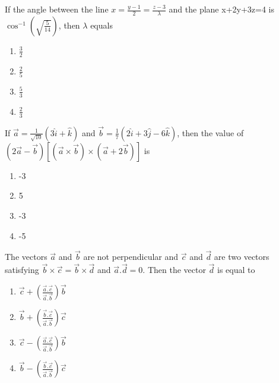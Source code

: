 \item If the angle between the line $x=\frac{y-1}{2}=\frac{z-3}{\lambda}$ and the plane x+2y+3z=4 is $\cos^{-1}(\sqrt{\frac{5}{14}})$, then $\lambda$ equals
\begin{enumerate}
\item $\frac{3}{2}$
\item $\frac{2}{5}$
\item $\frac{5}{3}$
\item $\frac{2}{3}$
\end{enumerate}

\item If $\overrightarrow{a}=\frac{1}{\sqrt{10}}(3\hat{i}+\hat{k})$ and $\overrightarrow{b}=\frac{1}{7}(2\hat{i}+3\hat{j}-6\hat{k})$, then the value of $(2\overrightarrow{a}-\overrightarrow{b})[(\overrightarrow{a} \times \overrightarrow{b}) \times (\overrightarrow{a}+2\overrightarrow{b})]$ is
\begin{enumerate}
\item -3
\item 5
\item -3
\item -5
\end{enumerate}

\item The vectors $\overrightarrow{a}$ and $\overrightarrow{b}$ are not perpendicular and $\overrightarrow{c}$  and $\overrightarrow{d}$ are two vectors satisfying $\overrightarrow{b} \times \overrightarrow{c}=\overrightarrow{b} \times \overrightarrow{d}$ and $\overrightarrow{a}.\overrightarrow{d}=0$. Then the vector $\overrightarrow{d}$ is equal to
\begin{enumerate}
\item $\overrightarrow{c}+(\frac{\overrightarrow{a}.\overrightarrow{c}}{\overrightarrow{a}.\overrightarrow{b}})\overrightarrow{b}$
\item $\overrightarrow{b}+(\frac{\overrightarrow{b}.\overrightarrow{c}}{\overrightarrow{a}.\overrightarrow{b}})\overrightarrow{c}$
\item $\overrightarrow{c}-(\frac{\overrightarrow{a}.\overrightarrow{c}}{\overrightarrow{a}.\overrightarrow{b}})\overrightarrow{b}$
\item $\overrightarrow{b}-(\frac{\overrightarrow{b}.\overrightarrow{c}}{\overrightarrow{a}.\overrightarrow{b}})\overrightarrow{c}$
\end{enumerate}

